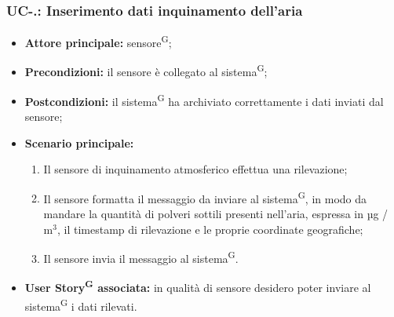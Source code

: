 \documentclass[8pt]{article}
\newcommand{\glossterm}[1]{#1\textsuperscript{G}} %
\begin{document}
\subsubsection*{UC-\theuc .\speconenumber: Inserimento dati inquinamento dell'aria}
\begin{itemize}
    \item \textbf{Attore principale:} \glossterm{sensore};
    \item \textbf{Precondizioni:} il sensore è collegato al \glossterm{sistema};
    \item \textbf{Postcondizioni:} il \glossterm{sistema} ha archiviato correttamente i dati inviati dal sensore;
    \item \textbf{Scenario principale:}
        \begin{enumerate}
        \item Il sensore di inquinamento atmosferico effettua una rilevazione;
        \item Il sensore formatta il messaggio da inviare al \glossterm{sistema}, in modo da mandare la quantità di polveri sottili presenti nell'aria, espressa in µg / $\mbox{m}^{\mbox{3}}$, il timestamp di rilevazione e le proprie
coordinate geografiche;
        \item Il sensore invia il messaggio al \glossterm{sistema}.
        \end{enumerate}
    \item \textbf{\glossterm{User Story} associata:} in qualità di sensore desidero poter inviare al \glossterm{sistema} i
        dati rilevati.
\end{itemize}
\end{document}
